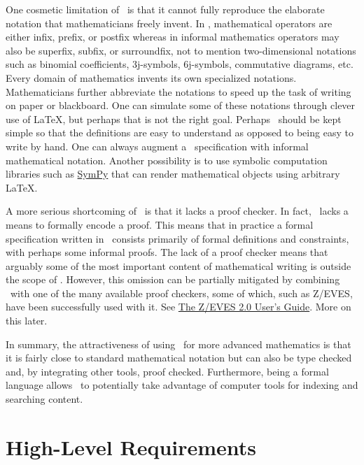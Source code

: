 \documentclass{amsart}
\begin{document}
One cosmetic limitation of \ZN\ is that it cannot fully reproduce the elaborate notation that mathematicians freely invent.
In \ZN, mathematical operators are either infix, prefix, or postfix whereas in informal mathematics operators may also be 
superfix, subfix, or surroundfix, not to mention two-dimensional notations such as binomial coefficients,
3j-symbols, 6j-symbols, commutative diagrams, etc.
Every domain of mathematics invents its own specialized notations.
Mathematicians further abbreviate the notations to speed up the task of writing on paper or blackboard.
One can simulate some of these notations through clever use of \LaTeX, but perhaps that is not the right goal.
Perhaps \ZN\ should be kept simple so that the definitions are easy to understand as opposed to being easy to write by hand.
One can always augment a \ZN\ specification with informal mathematical notation.
Another possibility is to use symbolic computation libraries such as \href{https://www.sympy.org}{SymPy} that can render mathematical objects using arbitrary \LaTeX.

A more serious shortcoming of \ZN\ is that it lacks a proof checker.
In fact, \ZN\ lacks a means to formally encode a proof.
This means that in practice a formal specification written in \ZN\ consists primarily of formal definitions and constraints, with perhaps some
informal proofs.
The lack of a proof checker means that arguably some of the most important content of mathematical writing is outside the scope of
\ZN.
However, this omission can be partially mitigated by combining \ZN\ with one of the many available proof checkers, some of which,
such as Z/EVES, have been successfully used with it. 
See \href{https://www.csm.ornl.gov/~sheldon/bucket/ze_userguide.pdf}{The Z/EVES 2.0 User's Guide}.
More on this later.

In summary, the attractiveness of using \ZN\ for more advanced mathematics is that it is fairly close to standard mathematical notation but can also
be type checked and, by integrating other tools, proof checked.
Furthermore, being a formal language allows \ZN\ to potentially take advantage of computer tools for indexing and searching content.

\section{High-Level Requirements}
\end{document}
